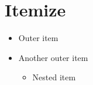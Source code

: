 \documentclass{article}
\begin{document}
\section{Itemize}
\begin{itemize}
\item Outer item
\item Another outer item
\begin{itemize}
\item Nested item
\end{itemize}
\end{itemize}
\end{document}
